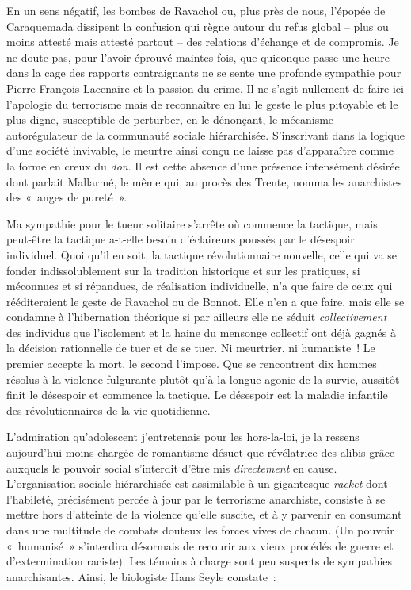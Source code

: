 \documentclass[french,twoside]{book} %
\begin{document}
En un sens négatif, les bombes de Ravachol ou, plus près de nous, l’épopée de Caraquemada dissipent la confusion qui règne autour du refus global – plus ou moins attesté mais attesté partout – des relations d’échange et de compromis. Je ne doute pas, pour l’avoir éprouvé maintes fois, que quiconque passe une heure dans la cage des rapports contraignants ne se sente une profonde sympathie pour Pierre-François Lacenaire et la passion du crime. Il ne s’agit nullement de faire ici l’apologie du terrorisme mais de reconnaître en lui le geste le plus pitoyable et le plus digne, susceptible de perturber, en le dénonçant, le mécanisme autorégulateur de la communauté sociale hiérarchisée. S’inscrivant dans la logique d’une société invivable, le meurtre ainsi conçu ne laisse pas d’apparaître comme la forme en creux du \emph{don}. Il est cette absence d’une présence intensément désirée dont parlait Mallarmé, le même qui, au procès des Trente, nomma les anarchistes des « anges de pureté ».\par
Ma sympathie pour le tueur solitaire s’arrête où commence la tactique, mais peut-être la tactique a-t-elle besoin d’éclaireurs poussés par le désespoir individuel. Quoi qu’il en soit, la tactique révolutionnaire nouvelle, celle qui va se fonder indissolublement sur la tradition historique et sur les pratiques, si méconnues et si répandues, de réalisation individuelle, n’a que faire de ceux qui rééditeraient le geste de Ravachol ou de Bonnot. Elle n’en a que faire, mais elle se condamne à l’hibernation théorique si par ailleurs elle ne séduit \emph{collectivement} des individus que l’isolement et la haine du mensonge collectif ont déjà gagnés à la décision rationnelle de tuer et de se tuer. Ni meurtrier, ni humaniste ! Le premier accepte la mort, le second l’impose. Que se rencontrent dix hommes résolus à la violence fulgurante plutôt qu’à la longue agonie de la survie, aussitôt finit le désespoir et commence la tactique. Le désespoir est la maladie infantile des révolutionnaires de la vie quotidienne.\par
L’admiration qu’adolescent j’entretenais pour les hors-la-loi, je la ressens aujourd’hui moins chargée de romantisme désuet que révélatrice des alibis grâce auxquels le pouvoir social s’interdit d’être mis \emph{directement} en cause. L’organisation sociale hiérarchisée est assimilable à un gigantesque \emph{racket} dont l’habileté, précisément percée à jour par le terrorisme anarchiste, consiste à se mettre hors d’atteinte de la violence qu’elle suscite, et à y parvenir en consumant dans une multitude de combats douteux les forces vives de chacun. (Un pouvoir « humanisé » s’interdira désormais de recourir aux vieux procédés de guerre et d’extermination raciste). Les témoins à charge sont peu suspects de sympathies anarchisantes. Ainsi, le biologiste Hans Seyle constate :\par
\end{document}
